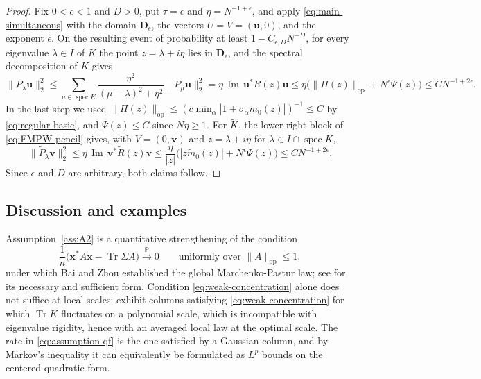 \documentclass[11pt,reqno]{amsart}
\def\u{\mathbf{u}}
\def\bv{\mathbf{v}}
\def\x{\mathbf{x}}
\def\P{\mathbb{P}}
\def\bD{\mathbf{D}}
\def\Im{\operatorname{Im}}
\def\op{\mathrm{op}}
\def\Tr{\operatorname{Tr}}
\def\spec{\operatorname{spec}}
\theoremstyle{definition}
\numberwithin{equation}{section}
\numberwithin{figure}{section}
\begin{document}
\begin{proof}
Fix $0 <\epsilon<1$ and $D>0$, put $\tau=\epsilon$ and $\eta=N^{-1+\epsilon}$, and apply \eqref{eq:main-simultaneous} with the domain $\bD_\epsilon$, the vectors $U=V=(\u,0)$, and the exponent $\epsilon$. On the resulting event of probability at least $1-C_{\epsilon,D}N^{-D}$, for every eigenvalue $\lambda\in I$ of $K$ the point $z=\lambda+i\eta$ lies in $\bD_\epsilon$, and the spectral decomposition of $K$ gives
\[
 \|P_\lambda\u\|_2^2\le\sum_{\mu\in\spec K}\frac{\eta^2}{(\mu-\lambda)^2+\eta^2}\|P_\mu\u\|_2^2
 =\eta\,\Im\,\u^*R(z)\u\le\eta\big(\|\Pi(z)\|_\op+N^{\epsilon}\Psi(z)\big)\le CN^{-1+2\epsilon}.
\]
In the last step we used $\|\Pi(z)\|_\op\le (c\min_\alpha|1+\sigma_\alpha\widetilde m_0(z)|)^{-1}\le C$ by \eqref{eq:regular-basic}, and $\Psi(z)\le C$ since $N\eta\ge1$. For $\widetilde K$, the lower-right block of \eqref{eq:FMPW-pencil} gives, with $V=(0,\bv)$ and $z=\lambda+i\eta$ for $\lambda\in I\cap\spec\widetilde K$,
\[
 \|\widetilde P_\lambda\bv\|_2^2\le\eta\,\Im\,\bv^*\widetilde R(z)\bv\le\frac{\eta}{|z|}\big(|z\widetilde m_0(z)|+N^{\epsilon}\Psi(z)\big)\le CN^{-1+2\epsilon}.
\]
Since $\epsilon$ and $D$ are arbitrary, both claims follow.
\end{proof}



\subsection{Discussion and examples}\label{sec:examples}

Assumption~\ref{ass:A2} is a quantitative strengthening of the condition
\begin{equation}\label{eq:weak-concentration}
 \frac{1}{n} \big(\x^*A\x-\Tr \Sigma A\big)\overset{\P}{\longrightarrow} 0\qquad\text{uniformly over }\|A\|_\op\le1,
\end{equation}
under which Bai and Zhou \cite{bai2008large} established the global Marchenko-Pastur law; see \cite{yaskov2016necessary} for its necessary and sufficient form. Condition \eqref{eq:weak-concentration} alone does not suffice at local scales: \cite[Section~2.6]{fan2026anisotropic} exhibit columns satisfying \eqref{eq:weak-concentration} for which $\Tr K$ fluctuates on a polynomial scale, which is incompatible with eigenvalue rigidity, hence with an averaged local law at the optimal scale. The rate in \eqref{eq:assumption-qf} is the one satisfied by a Gaussian column, and by Markov's inequality it can equivalently be formulated as $L^p$ bounds on the centered quadratic form. 
\end{document}

